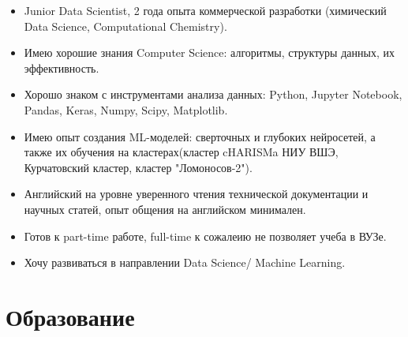 \documentclass[letterpaper]{twentysecondcv} %
\begin{document}
\begin{itemize}
\item Junior Data Scientist, 2 года опыта коммерческой разработки \linebreak
(химический Data Science, Computational Chemistry). 

\item Имею хорошие
знания Computer Science: алгоритмы, структуры данных, их эффективность. 

\item Хорошо
знаком с инструментами анализа данных:
Python, Jupyter Notebook, Pandas, Keras,
Numpy, Scipy, Matplotlib. 

\item Имею опыт создания ML-моделей: сверточных и глубоких нейросетей, а также их 
обучения на кластерах(кластер cHARISMa НИУ ВШЭ, Курчатовский кластер, кластер "Ломоносов-2").

\item Английский на уровне уверенного чтения технической документации и научных статей,
опыт общения на английском минимален.

\item Готов к part-time работе, full-time к сожалеию
не позволяет учеба в ВУЗе.

\item Хочу развиваться в направлении Data Science/ Machine Learning.
\end{itemize}


\section{Образование}

\begin{twenty} %
	
\end{twenty}
\end{document}
